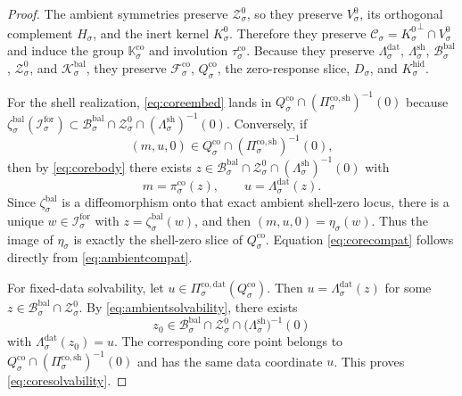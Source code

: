 \documentclass[11pt]{article}
\newcommand{\ForSpace}[1]{\mathcal I_{#1}^{\mathrm{for}}}
\newcommand{\BalBody}[1]{\mathcal B_{#1}^{\mathrm{bal}}}
\newcommand{\BalData}[1]{\Lambda_{#1}^{\mathrm{dat}}}
\newcommand{\BalShell}[1]{\Lambda_{#1}^{\mathrm{sh}}}
\newcommand{\ZeroHiddenSlice}[1]{\mathcal Z_{#1}^{0}}
\newcommand{\ZeroHiddenVec}[1]{V_{#1}^{0}}
\newcommand{\Kernel}[1]{K_{#1}^{0}}
\newcommand{\BalOp}[1]{\mathcal K_{#1}^{\mathrm{bal}}}
\newcommand{\BalEmbed}[1]{\zeta_{#1}^{\mathrm{bal}}}
\newcommand{\GapSpace}[1]{H_{#1}}
\newcommand{\GapBody}[1]{D_{#1}}
\newcommand{\HiddenOperator}[1]{K_{#1}^{\mathrm{hid}}}
\newcommand{\CoreState}[1]{\mathcal C_{#1}}
\newcommand{\CoreAffine}[1]{\mathcal F_{#1}^{\mathrm{co}}}
\newcommand{\CoreBody}[1]{Q_{#1}^{\mathrm{co}}}
\newcommand{\CoreDataProj}[1]{\Pi_{#1}^{\mathrm{co,dat}}}
\newcommand{\CoreShellProj}[1]{\Pi_{#1}^{\mathrm{co,sh}}}
\newcommand{\CoreCoord}[1]{\pi_{#1}^{\mathrm{co}}}
\newcommand{\CoreSym}[1]{\mathbb K_{#1}^{\mathrm{co}}}
\newcommand{\CoreTime}[1]{\tau_{#1}^{\mathrm{co}}}
\newcommand{\CoreEmbed}[1]{\eta_{#1}}
\begin{document}
\begin{proof}
The ambient symmetries preserve \(\ZeroHiddenSlice{\sigma}\), so they preserve \(\ZeroHiddenVec{\sigma}\), its orthogonal complement \(\GapSpace{\sigma}\), and the inert kernel \(\Kernel{\sigma}\). Therefore they preserve \(\CoreState{\sigma}={\Kernel{\sigma}}^{\perp}\cap\ZeroHiddenVec{\sigma}\) and induce the group \(\CoreSym{\sigma}\) and involution \(\CoreTime{\sigma}\). Because they preserve \(\BalData{\sigma}\), \(\BalShell{\sigma}\), \(\BalBody{\sigma}\), \(\ZeroHiddenSlice{\sigma}\), and \(\BalOp{\sigma}\), they preserve \(\CoreAffine{\sigma}\), \(\CoreBody{\sigma}\), the zero-response slice, \(\GapBody{\sigma}\), and \(\HiddenOperator{\sigma}\).

For the shell realization, \eqref{eq:coreembed} lands in \(\CoreBody{\sigma}\cap(\CoreShellProj{\sigma})^{-1}(0)\) because \(\BalEmbed{\sigma}(\ForSpace{\sigma})\subset \BalBody{\sigma}\cap\ZeroHiddenSlice{\sigma}\cap(\BalShell{\sigma})^{-1}(0)\). Conversely, if
\[
(m,u,0)\in\CoreBody{\sigma}\cap(\CoreShellProj{\sigma})^{-1}(0),
\]
then by \eqref{eq:corebody} there exists \(z\in\BalBody{\sigma}\cap\ZeroHiddenSlice{\sigma}\cap(\BalShell{\sigma})^{-1}(0)\) with
\[
m=\CoreCoord{\sigma}(z),
\qquad
u=\BalData{\sigma}(z).
\]
Since \(\BalEmbed{\sigma}\) is a diffeomorphism onto that exact ambient shell-zero locus, there is a unique \(w\in\ForSpace{\sigma}\) with \(z=\BalEmbed{\sigma}(w)\), and then \((m,u,0)=\CoreEmbed{\sigma}(w)\). Thus the image of \(\CoreEmbed{\sigma}\) is exactly the shell-zero slice of \(\CoreBody{\sigma}\). Equation \eqref{eq:corecompat} follows directly from \eqref{eq:ambientcompat}.

For fixed-data solvability, let \(u\in\CoreDataProj{\sigma}(\CoreBody{\sigma})\). Then \(u=\BalData{\sigma}(z)\) for some \(z\in\BalBody{\sigma}\cap\ZeroHiddenSlice{\sigma}\). By \eqref{eq:ambientsolvability}, there exists
\[
z_{0}\in
\BalBody{\sigma}\cap
\ZeroHiddenSlice{\sigma}\cap
\bigl(\BalShell{\sigma}\bigr)^{-1}(0)
\]
with \(\BalData{\sigma}(z_{0})=u\). The corresponding core point belongs to \(\CoreBody{\sigma}\cap(\CoreShellProj{\sigma})^{-1}(0)\) and has the same data coordinate \(u\). This proves \eqref{eq:coresolvability}.


\end{proof}
\end{document}
